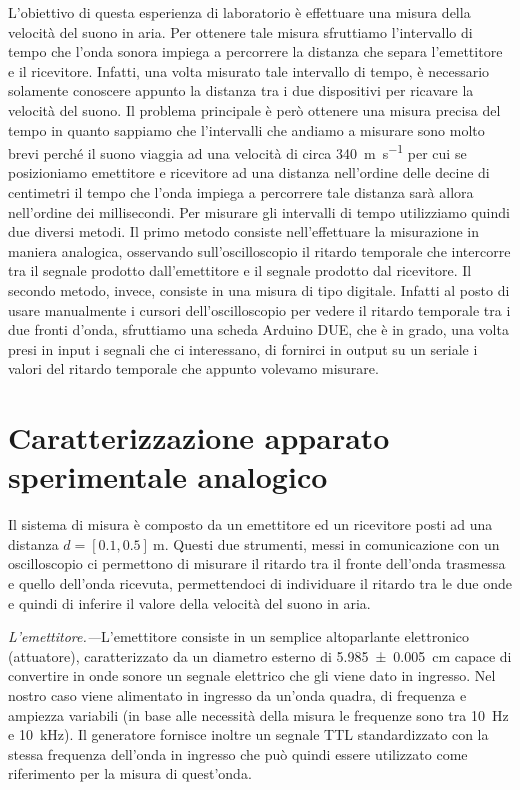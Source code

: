 \documentclass[
    rmp,
    reprint, 
    superscriptaddress, 
    altaffilletter, 
    amsmath, 
    amssymb, 
    a4paper,
    varvw]{revtex4-2}
\begin{document}
L'obiettivo di questa esperienza di laboratorio è effettuare una misura della velocità del suono in aria. Per ottenere tale misura sfruttiamo l'intervallo di tempo che l'onda sonora impiega a percorrere la distanza che separa l'emettitore e il ricevitore. Infatti, una volta misurato tale intervallo di tempo, è necessario solamente conoscere appunto la distanza tra i due dispositivi per ricavare la velocità del suono. Il problema principale è però ottenere una misura precisa del tempo in quanto sappiamo che l'intervalli che andiamo a misurare sono molto brevi perché il suono viaggia ad una velocità di circa \SI{340}{\metre\per\second} per cui se posizioniamo emettitore e ricevitore ad una distanza nell'ordine delle decine di centimetri il tempo che l'onda impiega a percorrere tale distanza sarà allora nell'ordine dei millisecondi. 
Per misurare gli intervalli di tempo utilizziamo quindi due diversi metodi. Il primo metodo consiste nell'effettuare la misurazione in maniera analogica, osservando sull'oscilloscopio il ritardo temporale che intercorre tra il segnale prodotto dall'emettitore e il segnale prodotto dal ricevitore. Il secondo metodo, invece, consiste in una misura di tipo digitale. Infatti al posto di usare manualmente i cursori dell'oscilloscopio per vedere il ritardo temporale tra i due fronti d'onda, sfruttiamo una scheda Arduino DUE, che è in grado, una volta presi in input i segnali che ci interessano, di fornirci in output su un seriale i valori del ritardo temporale che appunto volevamo misurare.  

\section{Caratterizzazione apparato sperimentale analogico}

Il sistema di misura è composto da un emettitore ed un ricevitore posti ad una distanza $d=[0.1, 0.5]~\si{\metre}$. Questi due strumenti, messi in comunicazione con un oscilloscopio ci permettono di misurare il ritardo tra il fronte dell'onda trasmessa e quello dell'onda ricevuta, permettendoci di individuare il ritardo tra le due onde e quindi di inferire il valore della velocità del suono in aria. 

\textit{L'emettitore.---}L'emettitore consiste in un semplice altoparlante elettronico (attuatore), caratterizzato da un diametro esterno di \SI{5.985+-0.005}{\centi\metre} capace di convertire in onde sonore un segnale elettrico che gli viene dato in ingresso. Nel nostro caso viene alimentato in ingresso da un'onda quadra, di frequenza e ampiezza variabili (in base alle necessità della misura le frequenze sono tra \SI{10}{\hertz} e \SI{10}{\kilo\hertz}). Il generatore fornisce inoltre un segnale TTL standardizzato con la stessa frequenza dell'onda in ingresso che può quindi essere utilizzato come riferimento per la misura di quest'onda.
\end{document}
